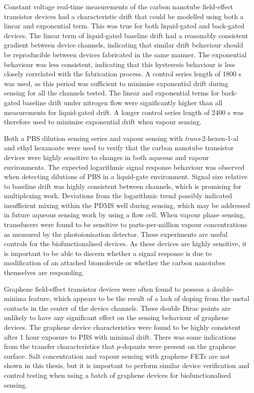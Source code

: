 \documentclass[
  a4paper,
]{scrbook}
\begin{document}
Constant voltage real-time measurements of the carbon nanotube
field-effect transistor devices had a characteristic drift that could be
modelled using both a linear and exponential term. This was true for
both liquid-gated and back-gated devices. The linear term of
liquid-gated baseline drift had a reasonably consistent gradient between
device channels, indicating that similar drift behaviour should be
reproducible between devices fabricated in the same manner. The
exponential behaviour was less consistent, indicating that this
hysteresis behaviour is less closely correlated with the fabrication
process. A control series length of 1800 s was used, as this period was
sufficient to minimise exponential drift during sensing for all the
channels tested. The linear and exponential terms for back-gated
baseline drift under nitrogen flow were significantly higher than all
measurements for liquid-gated drift. A longer control series length of
2400 s was therefore used to minimise exponential drift when vapour
sensing.

Both a PBS dilution sensing series and vapour sensing with
\emph{trans}-2-hexen-1-al and ethyl hexanoate were used to verify that
the carbon nanotube transistor devices were highly sensitive to changes
in both aqueous and vapour environments. The expected logarithmic signal
response behaviour was observed when detecting dilutions of PBS in a
liquid-gate environment. Signal size relative to baseline drift was
highly consistent between channels, which is promising for multiplexing
work. Deviations from the logarithmic trend possibly indicated
insufficient mixing within the PDMS well during sensing, which may be
addressed in future aqueous sensing work by using a flow cell. When
vapour phase sensing, transducers were found to be sensitive to
parts-per-million vapour concentrations as measured by the
photoionisation detector. These experiments are useful controls for the
biofunctionalised devices. As these devices are highly sensitive, it is
important to be able to discern whether a signal response is due to
modification of an attached biomolecule or whether the carbon nanotubes
themselves are responding.

Graphene field-effect transistor devices were often found to possess a
double-minima feature, which appears to be the result of a lack of
doping from the metal contacts in the center of the device channels.
These double Dirac points are unlikely to have any significant effect on
the sensing behaviour of graphene devices. The graphene device
characteristics were found to be highly consistent after 1 hour exposure
to PBS with minimal drift. There was some indications from the transfer
characteristics that \(p\)-dopants were present on the graphene surface.
Salt concentration and vapour sensing with graphene FETs are not shown
in this thesis, but it is important to perform similar device
verification and control testing when using a batch of graphene devices
for biofunctionalised sensing.
\end{document}
